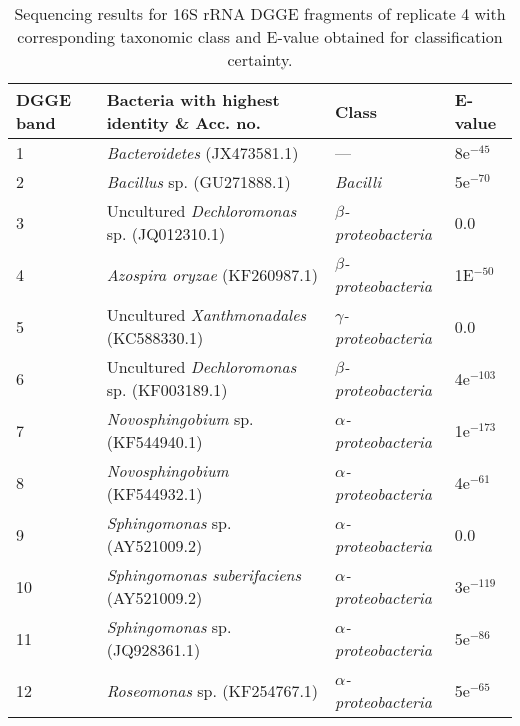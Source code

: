 \documentclass[twoside]{article}
\begin{document}
\begin{table}
\caption{Sequencing results for 16S rRNA DGGE fragments of replicate 4 with corresponding taxonomic class and E-value obtained for classification certainty.}
\begin{tabular}{ | l | p{7.8cm} | p{3cm} | l | }
\hline
DGGE band & Bacteria with highest identity \& Acc. no. & Class & E-value \\
\hline
1   &  \emph{Bacteroidetes} (JX473581.1) & --- & 8e$^{-45}$ \\
\hline
2  & \emph{Bacillus} sp. (GU271888.1) & \emph{Bacilli} & 5e$^{-70}$ \\
\hline
3 & Uncultured \emph{Dechloromonas} sp. (JQ012310.1) & \emph{$\beta$-proteobacteria} & 0.0 \\
\hline
4 & \emph{Azospira oryzae} (KF260987.1) & \emph{$\beta$-proteobacteria} & 1E$^{-50}$ \\
\hline
5 & Uncultured \emph{Xanthmonadales} (KC588330.1) & \emph{$\gamma$-proteobacteria} & 0.0 \\
\hline
6 & Uncultured \emph{Dechloromonas} sp. (KF003189.1) & \emph{$\beta$-proteobacteria} & 4e$^{-103}$ \\
\hline
7 & \emph{Novosphingobium} sp. (KF544940.1) & \emph{$\alpha$-proteobacteria} & 1e$^{-173}$ \\
\hline
8 & \emph{Novosphingobium} (KF544932.1) & \emph{$\alpha$-proteobacteria} & 4e$^{-61}$ \\
\hline
9 & \emph{Sphingomonas} sp. (AY521009.2) & \emph{$\alpha$-proteobacteria} & 0.0 \\
\hline
10 & \emph{Sphingomonas suberifaciens} (AY521009.2) & \emph{$\alpha$-proteobacteria} & 3e$^{-119}$ \\
\hline
11 & \emph{Sphingomonas} sp. (JQ928361.1) & \emph{$\alpha$-proteobacteria} & 5e$^{-86}$ \\
\hline
12 & \emph{Roseomonas} sp.  (KF254767.1) & \emph{$\alpha$-proteobacteria} & 5e$^{-65}$ \\
\hline
\end{tabular}

\end{table}
\FloatBarrier
\end{document}
